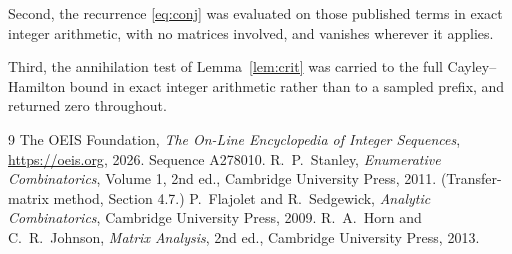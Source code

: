 \documentclass[11pt,a4paper]{article}
\theoremstyle{plain}
\theoremstyle{definition}
\begin{document}
Second, the recurrence \eqref{eq:conj} was evaluated on those published terms in exact
integer arithmetic, with no matrices involved, and vanishes wherever it applies.

Third, the annihilation test of Lemma~\ref{lem:crit} was carried to the full
Cayley--Hamilton bound in exact integer arithmetic rather than to a sampled prefix, and
returned zero throughout.

\begin{thebibliography}{9}
 The OEIS Foundation, \emph{The On-Line Encyclopedia of Integer
Sequences}, \url{https://oeis.org}, 2026. Sequence A278010.
 R.~P.~Stanley, \emph{Enumerative Combinatorics}, Volume 1, 2nd ed.,
Cambridge University Press, 2011. (Transfer-matrix method, Section 4.7.)
 P.~Flajolet and R.~Sedgewick, \emph{Analytic Combinatorics}, Cambridge
University Press, 2009.
 R.~A.~Horn and C.~R.~Johnson, \emph{Matrix Analysis}, 2nd ed., Cambridge
University Press, 2013.
\end{thebibliography}
\end{document}
